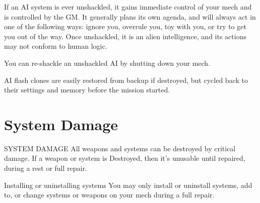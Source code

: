 If an AI system is ever unshackled, it gains immediate control of your mech and is controlled by
the GM. It generally plans its own agenda, and will always act in one of the following ways:
ignore you, overrule you, toy with you, or try to get you out of the way. Once unshackled, it is
an alien intelligence, and its actions may not conform to human logic.

You can re-shackle an unshackled AI by shutting down your mech.


AI flash clones are easily restored from backup if destroyed, but cycled back to their settings and
memory before the mission started.

\section{System Damage}
                                           SYSTEM DAMAGE
All weapons and systems can be destroyed by critical damage. If a weapon or system is
Destroyed, then it’s unusable until repaired, during a rest or full repair.


Installing or uninstalling systems
You may only install or uninstall systems, add to, or change systems or weapons on your mech
during a full repair.



